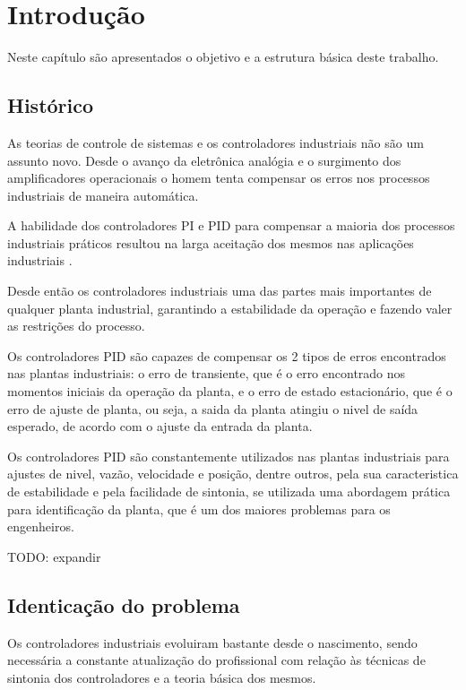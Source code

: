 \chapter{Introdução\label{cap:introducao}}

Neste capítulo são apresentados o objetivo e a estrutura básica deste trabalho.

\section{Histórico}

    As teorias de controle de sistemas e os controladores industriais não são um assunto
    novo. Desde o avanço da eletrônica analógia e o surgimento dos amplificadores
    operacionais o homem tenta compensar os erros nos processos industriais de maneira
    automática.

    A habilidade dos controladores \ac{PI} e \ac{PID} para compensar a maioria dos processos
    industriais práticos resultou na larga aceitação dos mesmos nas aplicações industriais
    \cite{Dwyer}.

    Desde então os controladores industriais uma das partes mais importantes de qualquer
    planta industrial, garantindo a estabilidade da operação e fazendo valer as restrições
    do processo.

    Os controladores \acs{PID} são capazes de compensar os 2 tipos de erros encontrados
    nas plantas industriais: o erro de transiente, que é o erro encontrado nos momentos
    iniciais da operação da planta, e o erro de estado estacionário, que é o erro de
    ajuste de planta, ou seja, a saida da planta atingiu o nivel de saída esperado, de
    acordo com o ajuste da entrada da planta.

    Os controladores \acs{PID} são constantemente utilizados nas plantas industriais para
    ajustes de nivel, vazão, velocidade e posição, dentre outros, pela sua caracteristica
    de estabilidade e pela facilidade de sintonia, se utilizada uma abordagem prática
    para identificação da planta, que é um dos maiores problemas para os engenheiros.

    TODO: expandir

\section{Identicação do problema}
    
    Os controladores industriais evoluiram bastante desde o nascimento, sendo necessária
    a constante atualização do profissional com relação às técnicas de sintonia dos
    controladores e a teoria básica dos mesmos.

